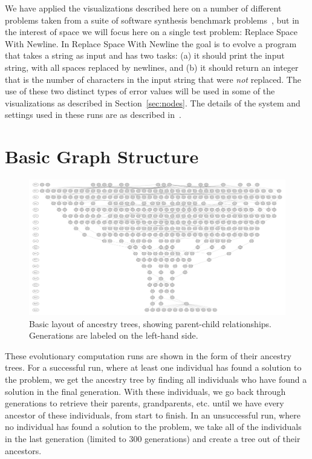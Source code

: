 \documentclass{sig-alternate}
\begin{document}
We have applied the visualizations described here on a 
number of different problems taken from a suite of software synthesis benchmark 
problems~\cite{Helmuth:2015:GECCO}, but in the interest of space we
will focus here on a single test problem: Replace Space With Newline.
In Replace Space With Newline the goal is to evolve a program that takes a string
as input and has two tasks: (a) it should print the input string, with all spaces
replaced by newlines, and (b) it should return an integer that is the number of
characters in the input string that were \emph{not} replaced. The use of
these two distinct types of error values will be used in some of the visualizations
as described in Section~\ref{sec:nodes}. The details of the system and
settings used in these runs are as described in~\cite{Helmuth:2015:GECCO}.

\section{Basic Graph Structure}
\label{sec:basics}

\begin{figure}[b]
	\begin{center}
		\includegraphics[width=\linewidth]{../Figures/run0_basic_structure.pdf}
	\end{center}
	\caption{Basic layout of ancestry trees, showing parent-child relationships. Generations are labeled on the left-hand side.}
	\label{fig:lexRun0Basic}
\end{figure}

These evolutionary computation runs are shown in the form of their ancestry trees. For a successful run, where at least one individual has found a solution to the problem, we get the ancestry tree by finding all individuals who have found a solution in the final generation. With these individuals, we go back through generations to retrieve their parents, grandparents, etc. until we have every ancestor of these individuals, from start to finish. In an unsuccessful run, where no individual has found a solution to the problem, we take all of the individuals in the last generation (limited to 300 generations) and create a tree out of their ancestors.
\end{document}
